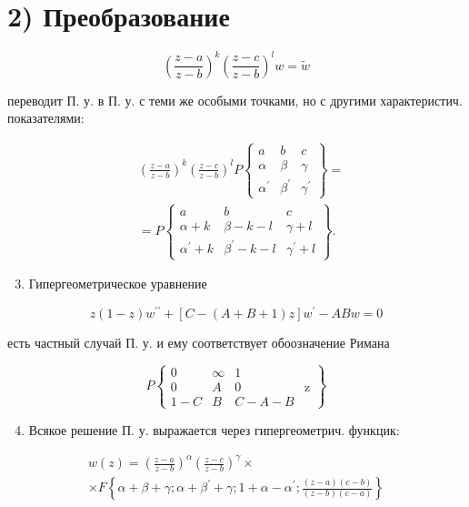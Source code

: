 \documentclass[10pt]{article}
\begin{document}
\section{2) Преобразование}
\[
\left(\frac{z-a}{z-b}\right)^{k}\left(\frac{z-c}{z-b}\right)^{l} w=\tilde{w}
\]

переводит П. у. в П. у. с теми же особыми точками, но с другими характеристич. показателями:

\[
\begin{aligned}
& \left(\frac{z-a}{z-b}\right)^{k}\left(\frac{z-c}{z-b}\right)^{l} P\left\{\begin{array}{ccc}
a & b & c \\
\alpha & \beta & \gamma \\
\alpha^{\prime} & \beta^{\prime} & \gamma^{\prime}
\end{array}\right\}= \\
& =P\left\{\begin{array}{ccc}
a & b & c \\
\alpha+k & \beta-k-l & \gamma+l \\
\alpha^{\prime}+k & \beta^{\prime}-k-l & \gamma^{\prime}+l
\end{array}\right\} .
\end{aligned}
\]

\begin{enumerate}
  \setcounter{enumi}{2}
  \item Гипергеометрическое уравнение
\end{enumerate}

\[
z(1-z) w^{\prime \prime}+[C-(A+B+1) z] w^{\prime}-A B w=0
\]

есть частный случай П. у. и ему соответствует обоозначение Римана

\[
P\left\{\begin{array}{cccc}
0 & \infty & 1 & \\
0 & A & 0 & \mathrm{z} \\
1-C & B & C-A-B
\end{array}\right\}
\]

\begin{enumerate}
  \setcounter{enumi}{3}
  \item Всякое решение П. у. выражается через гипергеометрич. функцик:
\end{enumerate}

\[
\begin{gathered}
w(z)=\left(\frac{z-a}{z-b}\right)^{\alpha}\left(\frac{z-c}{z-b}\right)^{\gamma} \times \\
\times F\left\{\alpha+\beta+\gamma ; \alpha+\beta^{\prime}+\gamma ; 1+\alpha-\alpha^{\prime} ; \frac{(z-a)(c-b)}{(z-b)(c-a)}\right\}
\end{gathered}
\]
\end{document}
